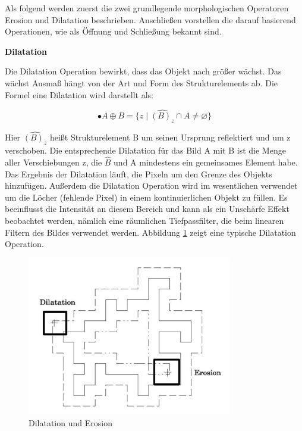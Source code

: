 Als folgend werden zuerst die zwei grundlegende morphologischen Operatoren Erosion und Dilatation beschrieben. Anschließen vorstellen die darauf basierend Operationen, wie als Öffnung und Schließung bekannt sind.

\textbf{Dilatation}

Die Dilatation Operation bewirkt, dass das Objekt nach größer wächst. Das wächst Ausmaß hängt von der Art und Form des Strukturelements ab. Die Formel eine Dilatation wird darstellt als:

\begin{equation}
•A \oplus B =\lbrace z \mid \widehat{(B)_z} \cap A \ne \varnothing \rbrace  
\end{equation}

Hier $ \widehat{(B)_z} $ heißt Strukturelement B um seinen Ursprung reflektiert und um z verschoben. Die entsprechende Dilatation für das Bild A mit B ist die Menge aller Verschiebungen z, die $ \widehat{B} $ und A mindestens ein gemeinsames Element habe. Das Ergebnis der Dilatation läuft, die Pixeln um den Grenze des Objekts hinzufügen. Außerdem die Dilatation Operation wird im wesentlichen verwendet um die Löcher (fehlende Pixel) in einem kontinuierlichen Objekt zu füllen. Es beeinflusst die Intensität an diesem Bereich und kann als ein Unschärfe Effekt beobachtet werden, nämlich eine räumlichen Tiefpassfilter, die beim linearen Filtern des Bildes verwendet werden. Abbildung \ref{fig:Dilatation und Erosion} zeigt eine typische Dilatation Operation.

\begin{figure}[htb]
 \centering 
  \includegraphics[keepaspectratio,width=0.8\textwidth]{images/4_ZweiteErfahrung/Morphological/DilatationundErosion.pdf}
 \caption{Dilatation und Erosion}
 \label{fig:Dilatation und Erosion}
\end{figure} 


